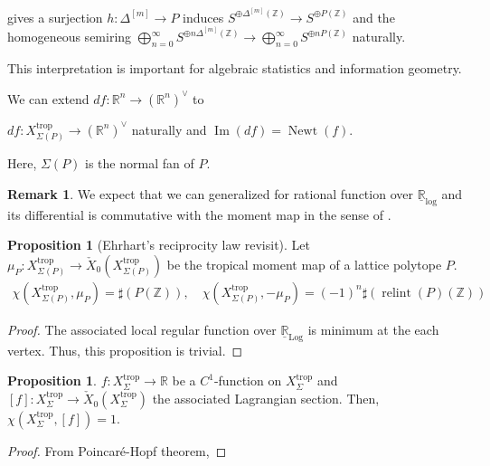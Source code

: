 \documentclass[a4paper,dvipdfmx,reqno,12pt]{amsart}
\theoremstyle{definition}
\newtheorem{Prop}[Thm]{Proposition}
\newtheorem{Rmk}[Thm]{Remark}
\newcommand{\R}{\mathbb{R}}%
\newcommand{\Z}{\mathbb{Z}}%
\newcommand{\opn}[1]{\operatorname{#1}}
\numberwithin{equation}{section}
\begin{document}
gives a surjection $h:\Delta^{[m]}\to P$ induces
$S^{\oplus\Delta^{[m]}(\Z)}\to S^{\oplus P(\Z)}$ and the homogeneous
semiring
$\bigoplus_{n=0}^{\infty} S^{\oplus n\Delta^{[m]}(\Z)}
  \to \bigoplus_{n=0}^{\infty} S^{\oplus nP(\Z)}$ naturally.

This interpretation is important for algebraic statistics
and information geometry.

We can extend $df: \R^{n}\to (\R^{n})^{\vee}$ to

$df:X_{\Sigma(P)}^{\opn{trop}}\to (\R^{n})^{\vee}$ naturally and
$\opn{Im}(df)=\opn{Newt}(f)$.

Here, $\Sigma(P)$ is the normal fan of $P$.







\begin{Rmk}
  We expect that we can generalized for rational function
  over $\underline{\R}_{\opn{log}}$ and its differential is
  commutative with the moment map in the sense of .
\end{Rmk}

\begin{Prop}[Ehrhart's reciprocity law revisit]
  Let $\mu_P: X_{\Sigma (P)}^{\opn{trop}}
    \to \check{X}_0(X_{\Sigma (P)}^{\opn{trop}})$
  be the tropical moment map of a lattice polytope $P$.
  \begin{align}
    \chi(X_{\Sigma(P)}^{\opn{trop}},\mu_P)=\sharp (P(\Z)),
    \quad \chi(X_{\Sigma(P)}^{\opn{trop}},-\mu_P)=(-1)^{n}\sharp (\opn{relint}(P)(\Z))
  \end{align}
\end{Prop}
\begin{proof}
  The associated local regular function over $\underline{\R}_{\opn{Log}}$ is minimum at the each vertex.
  Thus, this proposition is trivial.
\end{proof}


\begin{Prop}
  $f:X_{\Sigma}^{\opn{trop}}\to \R$ be a $C^{1}$-function on $X_{\Sigma}^{\opn{trop}}$ and $[f]:X_{\Sigma}^{\opn{trop}} \to \check{X}_0(X_{\Sigma}^{\opn{trop}})$ the associated Lagrangian section.
  Then, $\chi(X_{\Sigma}^{\opn{trop}},[f])=1$.
\end{Prop}
\begin{proof}
  From Poincar\'e-Hopf theorem,
\end{proof}
\end{document}
